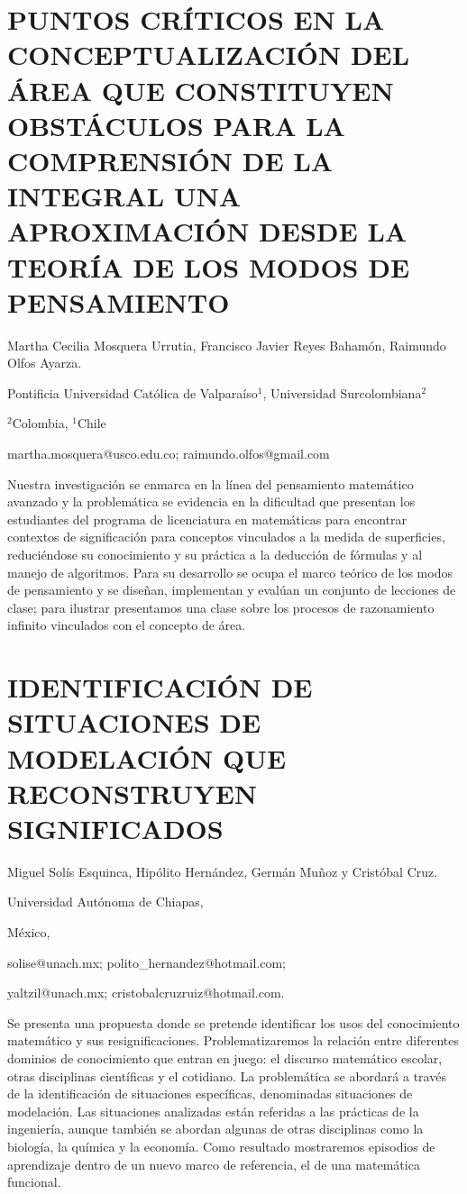 \section{PUNTOS CRÍTICOS EN LA CONCEPTUALIZACIÓN DEL ÁREA QUE CONSTITUYEN
OBSTÁCULOS PARA LA COMPRENSIÓN DE LA INTEGRAL \uppercase{ Una aproximación
desde la teoría de los Modos de pensamiento}}

\begin{datos}

Martha Cecilia Mosquera Urrutia, Francisco Javier Reyes Bahamón, Raimundo
Olfos Ayarza.

Pontificia Universidad Católica de Valparaíso$^{1}$, Universidad
Surcolombiana$^{2}$

$^{2}$Colombia, $^{1}$Chile

martha.mosquera@usco.edu.co; raimundo.olfos@gmail.com 

\end{datos}

Nuestra investigación se enmarca en la línea del pensamiento matemático
avanzado y la problemática se evidencia en la dificultad que presentan
los estudiantes del programa de licenciatura en matemáticas para encontrar
contextos de significación para conceptos vinculados a la medida de
superficies, reduciéndose su conocimiento y su práctica a la deducción
de fórmulas y al manejo de algoritmos. Para su desarrollo se ocupa
el marco teórico de los modos de pensamiento y se diseñan, implementan
y evalúan un conjunto de lecciones de clase; para ilustrar presentamos
una clase sobre los procesos de razonamiento infinito vinculados con
el concepto de área.


\section{IDENTIFICACIÓN DE SITUACIONES DE MODELACIÓN QUE RECONSTRUYEN SIGNIFICADOS}

\begin{datos}

Miguel Solís Esquinca, Hipólito Hernández, Germán Muñoz y Cristóbal
Cruz.

Universidad Autónoma de Chiapas,

México,

solise@unach.mx; polito\_hernandez@hotmail.com;

yaltzil@unach.mx; cristobalcruzruiz@hotmail.com.

\end{datos}

Se presenta una propuesta donde se pretende identificar los usos del
conocimiento matemático y sus resignificaciones. Problematizaremos
la relación entre diferentes dominios de conocimiento que entran en
juego: el discurso matemático escolar, otras disciplinas científicas
y el cotidiano. La problemática se abordará a través de la identificación
de situaciones específicas, denominadas situaciones de modelación.
Las situaciones analizadas están referidas a las prácticas de la ingeniería,
aunque también se abordan algunas de otras disciplinas como la biología,
la química y la economía. Como resultado mostraremos episodios de
aprendizaje dentro de un nuevo marco de referencia, el de una matemática
funcional.


